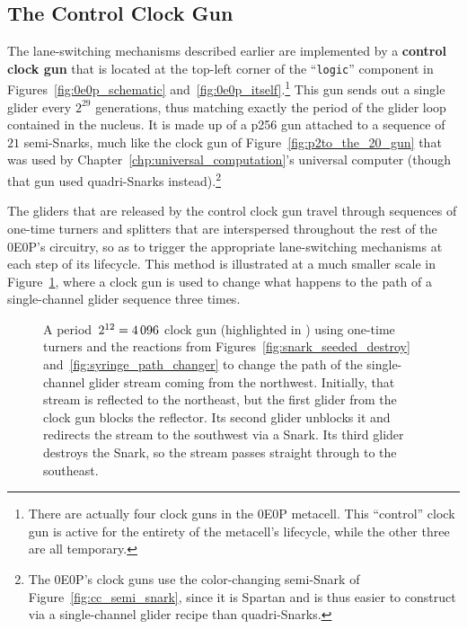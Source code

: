 \subsection{The Control Clock Gun}\label{sec:0e0p_structure_clock}

The lane-switching mechanisms described earlier are implemented by a \textbf{control clock gun} that is located at the top-left corner of the ``\texttt{logic}'' component in Figures~\ref{fig:0e0p_schematic} and~\ref{fig:0e0p_itself}.\footnote{There are actually four clock guns in the 0E0P metacell. This ``control'' clock gun is active for the entirety of the metacell's lifecycle, while the other three are all temporary.} This gun sends out a single glider every $2^{29}$ generations, thus matching exactly the period of the glider loop contained in the nucleus. It is made up of a p256 gun attached to a sequence of $21$ semi-Snarks, much like the clock gun of Figure~\ref{fig:p2to_the_20_gun} that was used by Chapter~\ref{chp:universal_computation}'s universal computer (though that gun used quadri-Snarks instead).\footnote{The 0E0P's clock guns use the color-changing semi-Snark of Figure~\ref{fig:cc_semi_snark}, since it is Spartan and is thus easier to construct via a single-channel glider recipe than quadri-Snarks.}

The gliders that are released by the control clock gun travel through sequences of one-time turners and splitters that are interspersed throughout the rest of the 0E0P's circuitry, so as to trigger the appropriate lane-switching mechanisms at each step of its lifecycle. This method is illustrated at a much smaller scale in Figure~\ref{fig:clock_path_switcher}, where a clock gun is used to change what happens to the path of a single-channel glider sequence three times.

\begin{figure}[!htb]
	\centering
	\caption{A period~$2^{12} = 4{\,}096$ clock gun (highlighted in ) using one-time turners and the reactions from Figures~\ref{fig:snark_seeded_destroy} and~\ref{fig:syringe_path_changer} to change the path of the single-channel glider stream coming from the northwest. Initially, that stream is reflected to the northeast, but the first glider from the clock gun blocks the reflector. Its second glider unblocks it and redirects the stream to the southwest via a Snark. Its third glider destroys the Snark, so the stream passes straight through to the southeast.}\label{fig:clock_path_switcher}
\end{figure}

